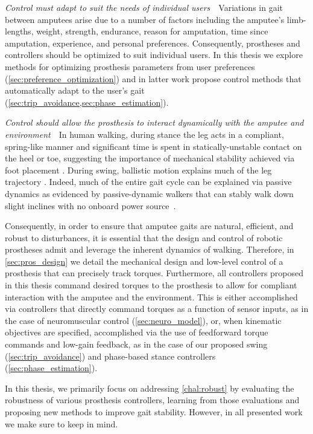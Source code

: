 \begin{challenges}
    \item\label{chal:unique} \emph{Control must adapt to suit the needs of
    individual users}~~Variations in gait between amputees arise due to a number
    of factors including the amputee's limb-lengths, weight, strength,
    endurance, reason for amputation, time since amputation, experience, and
    personal preferences. Consequently, prostheses and controllers should be
    optimized to suit individual users. In this thesis we explore methods for
    optimizing prosthesis parameters from user preferences
    (\cref{sec:preference_optimization}) and in latter work propose control
    methods that automatically adapt to the user's gait
    (\cref{sec:trip_avoidance,sec:phase_estimation}).

    \item\label{chal:dynamic} \emph{Control should allow the prosthesis to
    interact dynamically with the amputee and environment}~~In human walking,
    during stance the leg acts in a compliant, spring-like manner
    \citep{geyer2006compliant} and significant time is spent in
    statically-unstable contact on the heel or toe, suggesting the importance of
    mechanical stability achieved via foot placement \citep{perry2010gait}.
    During swing, ballistic motion explains much of the leg trajectory
    \citep{mochon1980ballistic}. Indeed, much of the entire gait cycle can be
    explained via passive dynamics as evidenced by passive-dynamic walkers that
    can stably walk down slight inclines with no onboard power
    source~\citep{mcgeer1990passive, collins2005efficient}.

    Consequently, in order to ensure that amputee gaits are natural, efficient,
    and robust to disturbances, it is essential that the design and control of
    robotic prostheses admit and leverage the inherent dynamics of walking.
    Therefore, in \cref{sec:pros_design} we detail the mechanical design and
    low-level control of a prosthesis that can precisely track torques.
    Furthermore, all controllers proposed in this thesis command desired torques
    to the prosthesis to allow for compliant interaction with the amputee and
    the environment. This is either accomplished via controllers that directly
    command torques as a function of sensor inputs, as in the case of
    neuromuscular control (\cref{sec:neuro_model}), or, when kinematic
    objectives are specified, accomplished via the use of feedforward torque
    commands and low-gain feedback, as in the case of our proposed swing
    (\cref{sec:trip_avoidance}) and phase-based stance controllers
    (\cref{sec:phase_estimation}).
\end{challenges}

In this thesis, we primarily focus on addressing \cref{chal:robust} by
evaluating the robustness of various prosthesis controllers, learning from those
evaluations and proposing new methods to improve gait stability. However, in all
presented work we make sure to keep  in
mind.
